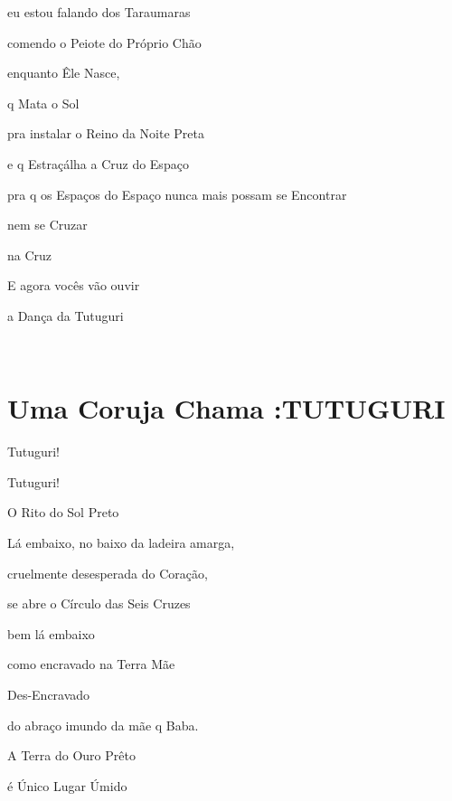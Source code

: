 eu estou falando dos Taraumaras

comendo o Peiote do Próprio Chão

enquanto Êle Nasce, 


q Mata o Sol

pra instalar o Reino da Noite Preta

e q Estraçálha a Cruz do Espaço

pra q os Espaços do Espaço nunca mais possam se Encontrar

nem se Cruzar

na Cruz

E agora vocês vão ouvir

a Dança da Tutuguri

~

\section*{Uma Coruja Chama :TUTUGURI}


Tutuguri!


Tutuguri!


O Rito do Sol Preto

Lá embaixo, no baixo da ladeira amarga,

cruelmente desesperada do Coração,

se abre o Círculo das Seis Cruzes


bem lá embaixo

como encravado na Terra Mãe

Des-Encravado


do abraço imundo da mãe q Baba.

A Terra do Ouro Prêto

é Único Lugar Úmido

